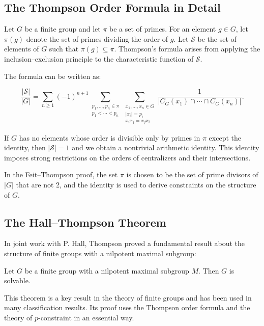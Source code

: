 \subsection{The Thompson Order Formula in Detail}

Let \(G\) be a finite group and let \(\pi\) be a set of primes. For an element \(g \in G\), let \(\pi(g)\) denote the set of primes dividing the order of \(g\). Let \(\mathcal{S}\) be the set of elements of \(G\) such that \(\pi(g) \subseteq \pi\). Thompson's formula arises from applying the inclusion--exclusion principle to the characteristic function of \(\mathcal{S}\).

The formula can be written as:

\[
\frac{|\mathcal{S}|}{|G|} = \sum_{n \geq 1} (-1)^{n+1} \sum_{\substack{p_1,\dots,p_n \in \pi \\ p_1 < \cdots < p_n}} \sum_{\substack{x_1,\dots,x_n \in G \\ |x_i| = p_i \\ x_i x_j = x_j x_i}} \frac{1}{|C_G(x_1) \cap \cdots \cap C_G(x_n)|}.
\]

If \(G\) has no elements whose order is divisible only by primes in \(\pi\) except the identity, then \(|\mathcal{S}| = 1\) and we obtain a nontrivial arithmetic identity. This identity imposes strong restrictions on the orders of centralizers and their intersections.

In the Feit--Thompson proof, the set \(\pi\) is chosen to be the set of prime divisors of \(|G|\) that are not 2, and the identity is used to derive constraints on the structure of \(G\).

\subsection{The Hall--Thompson Theorem}

In joint work with P. Hall, Thompson proved a fundamental result about the structure of finite groups with a nilpotent maximal subgroup:

\begin{theorem}
Let \(G\) be a finite group with a nilpotent maximal subgroup \(M\). Then \(G\) is solvable.
\end{theorem}

This theorem is a key result in the theory of finite groups and has been used in many classification results. Its proof uses the Thompson order formula and the theory of \(p\)-constraint in an essential way.

